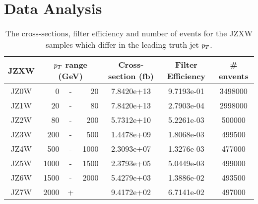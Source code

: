 \chapter{Data Analysis}





\begin{table}
  \centering
  \begin{tabular}{|c|rcr|c|c|c|}
    \hline 
     JZXW & \multicolumn{3}{|c|}{$p_T$ range (GeV)} & Cross-section (fb) & Filter Efficiency & \# envents  \\ 
    \hline
    \hline
		 JZ0W &     0 & - &    20 & 7.8420e+13 & 9.7193e-01 & 3498000 \\ 
    \hline
		 JZ1W &    20 & - &    80 & 7.8420e+13 & 2.7903e-04 & 2998000 \\
    \hline
		 JZ2W &    80 & - &   200 & 5.7312e+10 & 5.2261e-03 & 500000  \\
    \hline
		 JZ3W &   200 & - &   500 & 1.4478e+09 & 1.8068e-03 & 499500  \\
    \hline
		 JZ4W &   500 & - &  1000 & 2.3093e+07 & 1.3276e-03 & 477000  \\
    \hline
		 JZ5W &  1000 & - &  1500 & 2.3793e+05 & 5.0449e-03 & 499000  \\
    \hline
		 JZ6W &  1500 & - &  2000 & 5.4279e+03 & 1.3886e-02 & 493500  \\
    \hline
		 JZ7W &  2000 & + &       & 9.4172e+02 & 6.7141e-02 & 497000  \\
    \hline 
  \end{tabular}
  \caption{The cross-sections, filter efficiency and number of events for the JZXW samples which differ in the leading truth jet $p_T$.}
  \label{tab:JZXW}
\end{table}





